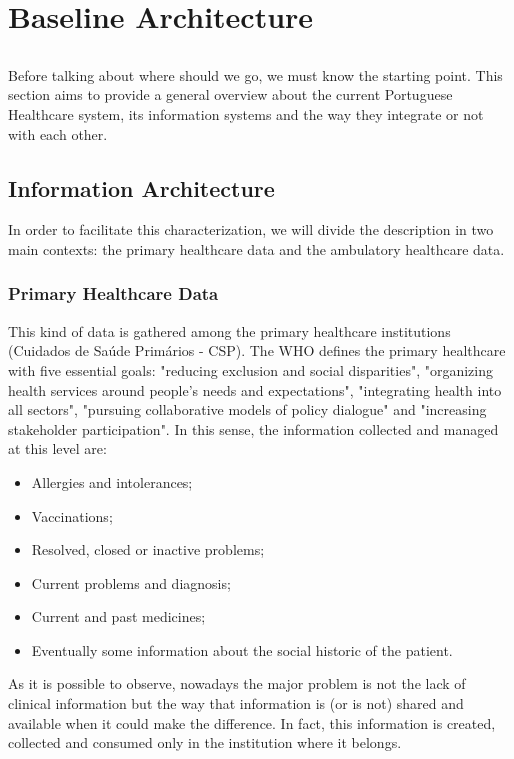 \chapter{Baseline Architecture} \label{chap:arch-proposal}

\section*{}

Before talking about where should we go, we must know the starting point. This section aims to provide a general overview about the current Portuguese Healthcare system, its information systems and the way they integrate or not with each other.

\section{Information Architecture}

In order to facilitate this characterization, we will divide the description in two main contexts: the primary healthcare data and the ambulatory healthcare data.

\subsection{Primary Healthcare Data}

This kind of data is gathered among the primary healthcare institutions (Cuidados de Saúde Primários - CSP). The WHO defines the primary healthcare with five essential goals: "reducing exclusion and social disparities", "organizing health services around people's needs and expectations", "integrating health into all sectors", "pursuing collaborative models of policy dialogue" and "increasing stakeholder participation". In this sense, the information collected and managed at this level are:
\begin{itemize}
\item Allergies and intolerances;
\item Vaccinations;
\item Resolved, closed or inactive problems;
\item Current problems and diagnosis;
\item Current and past medicines;
\item Eventually some information about the social historic of the patient.
\end{itemize}

As it is possible to observe, nowadays the major problem is not the lack of clinical information but the way that information is (or is not) shared and available when it could make the difference. In fact, this information is created, collected and consumed only in the institution where it belongs.

